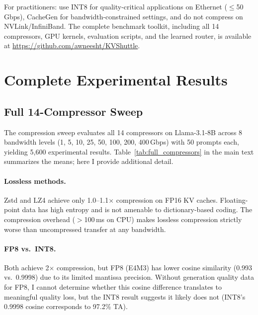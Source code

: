\documentclass{article}
\begin{document}
For practitioners: use INT8 for quality-critical applications on Ethernet ($\leq$50\,Gbps), CacheGen for bandwidth-constrained settings, and do not compress on NVLink/InfiniBand. The complete benchmark toolkit, including all 14 compressors, GPU kernels, evaluation scripts, and the learned router, is available at \url{https://github.com/awneesht/KVShuttle}.





\appendix

\section{Complete Experimental Results}
\label{app:results}

\subsection{Full 14-Compressor Sweep}

The compression sweep evaluates all 14 compressors on Llama-3.1-8B across 8 bandwidth levels (1, 5, 10, 25, 50, 100, 200, 400\,Gbps) with 50 prompts each, yielding 5{,}600 experimental results. Table~\ref{tab:full_compressors} in the main text summarizes the means; here I provide additional detail.

\paragraph{Lossless methods.} Zstd and LZ4 achieve only 1.0--1.1$\times$ compression on FP16 KV caches. Floating-point data has high entropy and is not amenable to dictionary-based coding. The compression overhead ($>$100\,ms on CPU) makes lossless compression strictly worse than uncompressed transfer at any bandwidth.

\paragraph{FP8 vs.\ INT8.} Both achieve 2$\times$ compression, but FP8 (E4M3) has lower cosine similarity (0.993 vs.\ 0.9998) due to its limited mantissa precision. Without generation quality data for FP8, I cannot determine whether this cosine difference translates to meaningful quality loss, but the INT8 result suggests it likely does not (INT8's 0.9998 cosine corresponds to 97.2\% TA).
\end{document}
